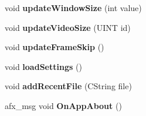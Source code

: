 \begin{DoxyCompactItemize}
void {\bfseries update\+Window\+Size} (int value)
\item 
\mbox{\label{class_v_b_a_afe121e9ee080eca73146eb339408a148}} 
void {\bfseries update\+Video\+Size} (U\+I\+NT id)
\item 
\mbox{\label{class_v_b_a_a2b3524193d398b041e90907430361ed8}} 
void {\bfseries update\+Frame\+Skip} ()
\item 
\mbox{\label{class_v_b_a_aed48a7db8cc5b65a1e495661f6040915}} 
void {\bfseries load\+Settings} ()
\item 
\mbox{\label{class_v_b_a_a6b68e58bd0ae7a246ca3c1cd66a1c9db}} 
void {\bfseries add\+Recent\+File} (C\+String file)
\item 
\mbox{\label{class_v_b_a_a0b2f996850d439b4c61c5f8ab7f5afb1}} 
afx\+\_\+msg void {\bfseries On\+App\+About} ()
\end{DoxyCompactItemize}
